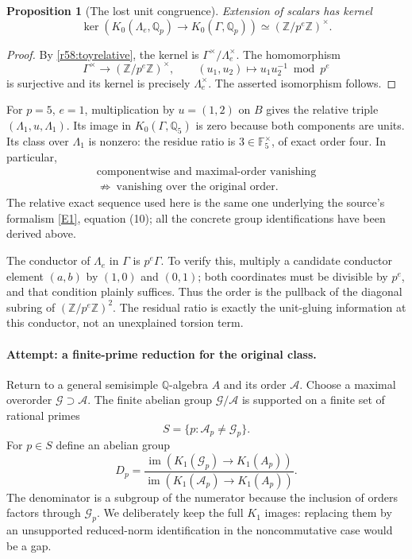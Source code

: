 \documentclass[11pt,a4paper]{article}
\newcommand{\Z}{\mathbb{Z}}
\newcommand{\Q}{\mathbb{Q}}
\newcommand{\F}{\mathbb{F}}
\newcommand{\eref}[2]{\hyperlink{extra:#1:#2}{[E#2]}}
\newtheorem{notebookproposition}[notebooklemma]{Proposition}
\numberwithin{equation}{section}
\begin{document}
\begin{notebookproposition}[The lost unit congruence]\label{r58:kernel}
Extension of scalars has kernel
\[
 \ker\!\left(K_0(\Lambda_e,\Q_p)\longrightarrow
                  K_0(\Gamma,\Q_p)\right)
       \simeq(\Z/p^e\Z)^\times.
\]
\end{notebookproposition}
\begin{proof}
By \eqref{r58:toyrelative}, the kernel is $\Gamma^\times/\Lambda_e^\times$. The homomorphism
\[
 \Gamma^\times\longrightarrow(\Z/p^e\Z)^\times,
 \qquad(u_1,u_2)\longmapsto u_1u_2^{-1}\bmod p^e
\]
is surjective and its kernel is precisely $\Lambda_e^\times$. The asserted isomorphism follows.
\end{proof}

For $p=5$, $e=1$, multiplication by $u=(1,2)$ on $B$ gives the relative triple $(\Lambda_1,u,\Lambda_1)$. Its image in $K_0(\Gamma,\Q_5)$ is zero because both components are units. Its class over $\Lambda_1$ is nonzero: the residue ratio is $3\in\F_5^\times$, of exact order four. In particular,
\begin{equation}\label{r58:falseimplication}
 \begin{gathered}
 \text{componentwise and maximal-order vanishing}\\
 \not\Longrightarrow\ \text{vanishing over the original order}.
 \end{gathered}
\end{equation}
The relative exact sequence used here is the same one underlying the source's formalism \eref{statement}{1}, equation (10); all the concrete group identifications have been derived above.

The conductor of $\Lambda_e$ in $\Gamma$ is $p^e\Gamma$. To verify this, multiply a candidate conductor element $(a,b)$ by $(1,0)$ and $(0,1)$; both coordinates must be divisible by $p^e$, and that condition plainly suffices. Thus the order is the pullback of the diagonal subring of $(\Z/p^e\Z)^2$. The residual ratio is exactly the unit-gluing information at this conductor, not an unexplained torsion term.

\paragraph{Attempt: a finite-prime reduction for the original class.}
Return to a general semisimple $\Q$-algebra $A$ and its order $\mathcal A$. Choose a maximal overorder $\mathcal G\supset\mathcal A$. The finite abelian group $\mathcal G/\mathcal A$ is supported on a finite set of rational primes
\[
 S=\{p:\mathcal A_p\ne\mathcal G_p\}.
\]
For $p\in S$ define an abelian group
\begin{equation}\label{r58:residual}
 D_p=\frac{\operatorname{im}(K_1(\mathcal G_p)\to K_1(A_p))}
           {\operatorname{im}(K_1(\mathcal A_p)\to K_1(A_p))}.
\end{equation}
The denominator is a subgroup of the numerator because the inclusion of orders factors through $\mathcal G_p$. We deliberately keep the full $K_1$ images: replacing them by an unsupported reduced-norm identification in the noncommutative case would be a gap.
\end{document}

